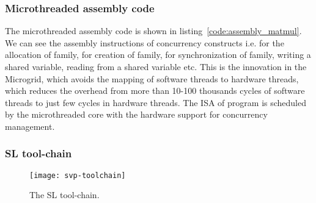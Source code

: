 \documentclass{article}
\begin{document}
\begin{figure}
\begin{minipage}{\textwidth}
\scriptsize
\lstset{float, language=C, caption=The microthreaded version of Matrix Multiplication.,
label=code:par_matmul} 
\end{minipage}
\end{figure}

\subsubsection*{Microthreaded assembly code}

The microthreaded assembly code is shown in listing~\ref{code:assembly_matmul}. We
can see the assembly instructions of concurrency constructs i.e.  for
the allocation of family,  for creation of family,  for
synchronization of family,  writing a shared variable,  reading
from a shared variable etc. This is the innovation in the Microgrid, which
avoids the mapping of software threads to hardware threads, which reduces the
overhead from more than 10-100 thousands cycles of software threads to just few
cycles in hardware threads. The ISA of
program is scheduled by the microthreaded core with the hardware support for
concurrency management.

\begin{figure}
\begin{minipage}{\textwidth}
\scriptsize
\lstset{float, language=C, caption=A snipper of the assembly program generated from the
microthreaded program of Matrix Multiplication for the Microgrid., label=code:assembly_matmul}

\end{minipage}
\end{figure}

\subsubsection*{SL tool-chain}

\begin{figure}

\begin{centering}

\texttt{[image: svp-toolchain]}

\caption{\label{fig:svp_toolchain}The SL tool-chain.}

\end{centering}

\end{figure}
\end{document}
